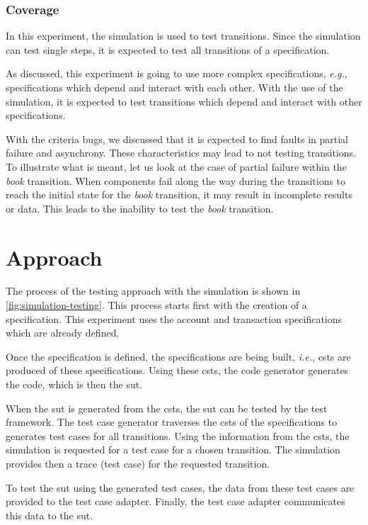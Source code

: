 \subsubsection{Coverage}
In this experiment, the simulation is used to test transitions. Since
the simulation can test single steps, it is expected to test all
transitions of a specification.

As discussed, this experiment is going to use more complex specifications,
\textit{e.g.}, specifications which depend and interact with each other. With
the use of the simulation, it is expected to test transitions which depend and
interact with other specifications.

With the criteria bugs, we discussed that it is expected to find faults in
partial failure and asynchrony. These characteristics may lead to not testing
transitions. To illustrate what is meant, let us look at the case of partial
failure within the \textit{book} transition. When components fail along the way
during the transitions to reach the initial state for the \textit{book}
transition, it may result in incomplete results or data. This leads to the
inability to test the \textit{book} transition.

\section{Approach}

The process of the testing approach with the simulation is shown in
\autoref{fig:simulation-testing}. This process starts first with the creation of
a specification. This experiment uses the account and transaction specifications
which are already defined.

Once the specification is defined, the specifications
are being built, \textit{i.e.}, \gls{csts} are produced of
these specifications. Using these \gls{csts}, the code generator generates the code,
which is then the \gls{sut}.

When the \gls{sut} is generated from the \gls{csts}, the \gls{sut} can be tested by the test
framework. The test case generator traverses the \gls{csts} of the specifications to
generates test cases for all transitions. Using the information from the \gls{csts},
the simulation is requested for a test case for a chosen transition. The
simulation provides then a trace (test case) for the requested transition.

To test the \gls{sut} using the generated test cases, the data
from these test cases are provided to the test case adapter. Finally, the test
case adapter communicates this data to the \gls{sut}.

